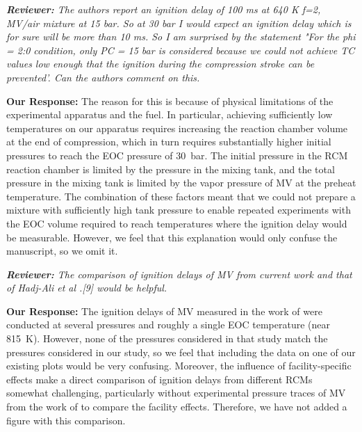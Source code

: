 \documentclass{article}
\newenvironment{reviewer}{\vspace{0.5\baselineskip}\begingroup\itshape\textbf{Reviewer:}}{\endgroup\vspace{0.5\baselineskip}}
\newenvironment{response}{\vspace{0.5\baselineskip}\textbf{Our Response:}}{\vspace{0.5\baselineskip}}
\begin{document}
\begin{reviewer}
    The authors report an ignition delay of 100 ms at 640 K f=2, MV/air mixture at 15 bar. So at 30
    bar I would expect an ignition delay which is for sure will be more than 10 ms. So I am
    surprised by the statement "For the phi = 2:0 condition, only  PC = 15 bar is considered because
    we could not achieve TC values low enough that the ignition during the compression stroke can be
    prevented'. Can the authors comment on this.
\end{reviewer}

\begin{response}
    The reason for this is because of physical limitations of the experimental apparatus and the
    fuel. In particular, achieving sufficiently low temperatures on our apparatus requires
    increasing the reaction chamber volume at the end of compression, which in turn requires
    substantially higher initial pressures to reach the EOC pressure of \SI{30}{\bar}. The initial
    pressure in the RCM reaction chamber is limited by the pressure in the mixing tank, and the
    total pressure in the mixing tank is limited by the vapor pressure of MV at the preheat
    temperature. The combination of these factors meant that we could not prepare a mixture with
    sufficiently high tank pressure to enable repeated experiments with the EOC volume required to
    reach temperatures where the ignition delay would be measurable. However, we feel that this
    explanation would only confuse the manuscript, so we omit it.
\end{response}

\begin{reviewer}
    The comparison of ignition delays of MV from current work and that of Hadj-Ali et al .[9] would
    be helpful.
\end{reviewer}

\begin{response}
    The ignition delays of MV measured in the work of \citet{Hadj-Ali2009} were conducted at several
    pressures and roughly a single EOC temperature (near \SI{815}{\K}). However, none of the
    pressures considered in that study match the pressures considered in our study, so we feel that
    including the data on one of our existing plots would be very confusing. Moreover, the influence
    of facility-specific effects make a direct comparison of ignition delays from different RCMs
    somewhat challenging, particularly without experimental pressure traces of MV from the work of
    \citet{Hadj-Ali2009} to compare the facility effects. Therefore, we have not added a figure with
    this comparison.
\end{response}
\end{document}
